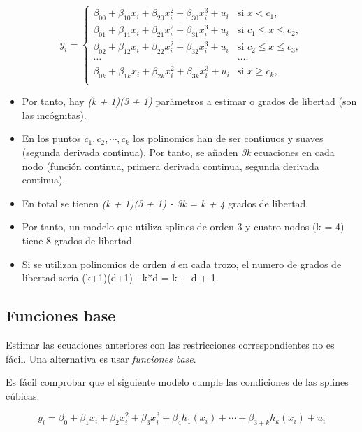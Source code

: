 \documentclass[
]{article}
\begin{document}
\[
\begin{equation*}
y_i = \left\{
\begin{array}{cl}
\beta_{00} + \beta_{10} x_i + \beta_{20} x_i^2 + \beta_{30} x_i^3 + u_i & \text{si } x < c_1,\\
\beta_{01} + \beta_{11} x_i + \beta_{21} x_i^2 + \beta_{31} x_i^3 + u_i & \text{si } c_1 \leq x \leq c_2, \\
\beta_{02} + \beta_{12} x_i + \beta_{22} x_i^2 + \beta_{32} x_i^3 + u_i & \text{si } c_2 \leq x \leq c_3, \\
\ldots & \ldots, \\
\beta_{0k} + \beta_{1k} x_i + \beta_{2k} x_i^2 + \beta_{3k} x_i^3 + u_i & \text{si } x \geq c_k, \\
\end{array} \right.
\end{equation*}
\]

\begin{itemize}
\item
  Por tanto, hay \emph{(k + 1)(3 + 1)} parámetros a estimar o grados de
  libertad (son las incógnitas).
\item
  En los puntos \(c_1, c_2, \cdots, c_k\) los polinomios han de ser
  continuos y suaves (segunda derivada continua). Por tanto, se añaden
  \emph{3k} ecuaciones en cada nodo (función continua, primera derivada
  continua, segunda derivada continua).
\item
  En total se tienen \emph{(k + 1)(3 + 1) - 3k = k + 4} grados de
  libertad.
\item
  Por tanto, un modelo que utiliza splines de orden 3 y cuatro nodos (k
  = 4) tiene 8 grados de libertad.
\item
  Si se utilizan polinomios de orden \emph{d} en cada trozo, el numero
  de grados de libertad sería (k+1)(d+1) - k*d = k + d + 1.
\end{itemize}

\hypertarget{funciones-base}{%
\subsection{Funciones base}\label{funciones-base}}

Estimar las ecuaciones anteriores con las restricciones correspondientes
no es fácil. Una alternativa es usar \emph{funciones base}.

Es fácil comprobar que el siguiente modelo cumple las condiciones de las
splines cúbicas:

\[
y_i = \beta_0 + \beta_1 x_i + \beta_2 x_i^2 + \beta_3 x_i^3  + \beta_{4} h_1(x_i) + \cdots + \beta_{3+k} h_k(x_i) + u_i
\]
\end{document}
